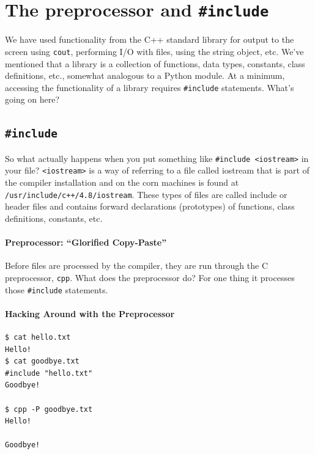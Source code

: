 \documentclass[12pt,letterpaper,twoside]{article}
\begin{document}






\section{\texorpdfstring{The preprocessor and \texttt{\#include}}{The preprocessor and \#include}}
We have used functionality from the C++ standard library for output to
the screen using \texttt{cout}, performing I/O with files, using the
string object, etc.
We've mentioned that a library is a collection of functions, data types, constants, class
definitions, etc., somewhat analogous to a Python module.
At a minimum, accessing the functionality of a library requires
\texttt{\#include} statements. What's going on here?

\subsection{\texorpdfstring{\texttt{\#include}}{\#include}}
So what actually happens when you put something like
\texttt{\#include\ \textless{}iostream\textgreater{}} in your file?
\texttt{\textless{}iostream\textgreater{}} is a way of referring to a
file called iostream that is part of the compiler installation and on
the corn machines is found at \texttt{/usr/include/c++/4.8/iostream}.
These types of files are called include or header files and contains
forward declarations (prototypes) of functions, class definitions,
constants, etc.

\paragraph{Preprocessor: ``Glorified Copy-Paste''}
Before files are processed by the compiler, they are run through the C
preprocessor, \texttt{cpp}.
What does the preprocessor do?
For one thing it processes those \texttt{\#include} statements.

\paragraph{Hacking Around with the Preprocessor}
\begin{verbatim}
$ cat hello.txt 
Hello!
$ cat goodbye.txt 
#include "hello.txt"
Goodbye!

$ cpp -P goodbye.txt 
Hello!

Goodbye!
\end{verbatim}
\end{document}
